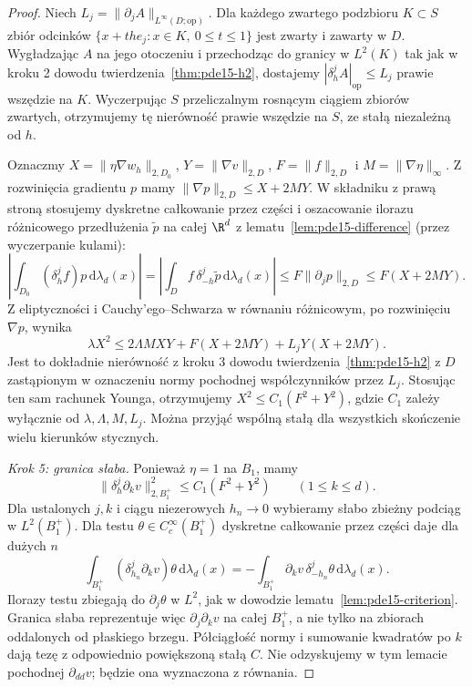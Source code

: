 \begin{proof}
Niech $L_j=\|\partial_jA\|_{L^\infty(D;\mathrm{op})}$.
Dla każdego zwartego podzbioru $K\subset S$ zbiór
odcinków $\{x+the_j:x\in K,\ 0\le t\le1\}$ jest
zwarty i zawarty w $D$. Wygładzając $A$ na jego otoczeniu
i przechodząc do granicy w $L^2(K)$ tak jak w kroku 2
dowodu twierdzenia~\ref{thm:pde15-h2}, dostajemy
$|\delta_h^jA|_{\mathrm{op}}\le L_j$ prawie wszędzie na $K$.
Wyczerpując $S$ przeliczalnym rosnącym ciągiem zbiorów
zwartych, otrzymujemy tę nierówność prawie wszędzie
na $S$, ze stałą niezależną od $h$.

Oznaczmy $X=\|\eta\nabla w_h\|_{2,D_0}$,
$Y=\|\nabla v\|_{2,D}$, $F=\|f\|_{2,D}$ i $M=\|\nabla\eta\|_\infty$.
Z rozwinięcia gradientu $p$ mamy
$\|\nabla p\|_{2,D}\le X+2MY$. W składniku z prawą stroną
stosujemy dyskretne całkowanie przez części i oszacowanie
ilorazu różnicowego przedłużenia $\widetilde p$
na całej $\R^d$ z lematu~\ref{lem:pde15-difference}
(przez wyczerpanie kulami):
\[
 \left|\int_{D_0}(\delta_h^jf)p\,\mathrm d\lambda_d(x)\right|
 =\left|\int_D f\,\delta_{-h}^j\widetilde p\,\mathrm d\lambda_d(x)\right|
 \le F\|\partial_j p\|_{2,D}\le F(X+2MY).
\]
Z eliptyczności i Cauchy'ego--Schwarza w równaniu
różnicowym, po rozwinięciu $\nabla p$, wynika
\[
 \lambda X^2\le 2\Lambda MXY+F(X+2MY)+L_jY(X+2MY).
\]
Jest to dokładnie nierówność z kroku 3 dowodu
twierdzenia~\ref{thm:pde15-h2} z $D$ zastąpionym
w oznaczeniu normy pochodnej współczynników przez $L_j$.
Stosując ten sam rachunek Younga, otrzymujemy
$X^2\le C_1(F^2+Y^2)$, gdzie $C_1$ zależy wyłącznie
od $\lambda,\Lambda,M,L_j$. Można przyjąć wspólną stałą
dla wszystkich skończenie wielu kierunków stycznych.

\emph{Krok 5: granica słaba.}
Ponieważ $\eta=1$ na $B_1$, mamy
\[
 \|\delta_h^j\partial_kv\|_{2,B_1^+}^2
 \le C_1(F^2+Y^2)\qquad(1\le k\le d).
\]
Dla ustalonych $j,k$ i ciągu niezerowych $h_n\to0$
wybieramy słabo zbieżny podciąg w $L^2(B_1^+)$.
Dla testu $\theta\in C_c^\infty(B_1^+)$
dyskretne całkowanie przez części daje dla dużych $n$
\[
 \int_{B_1^+}(\delta_{h_n}^j\partial_kv)\theta\,
       \mathrm d\lambda_d(x)
 =-\int_{B_1^+}\partial_kv\,\delta_{-h_n}^j\theta\,
       \mathrm d\lambda_d(x).
\]
Ilorazy testu zbiegają do $\partial_j\theta$ w $L^2$,
jak w dowodzie lematu~\ref{lem:pde15-criterion}.
Granica słaba reprezentuje więc $\partial_j\partial_kv$
na całej $B_1^+$, a nie tylko na zbiorach oddalonych
od płaskiego brzegu. Półciągłość normy i sumowanie
kwadratów po $k$ dają tezę z odpowiednio powiększoną
stałą $C$. Nie odzyskujemy w tym lemacie pochodnej
$\partial_{dd}v$; będzie ona wyznaczona z równania.
\end{proof}

